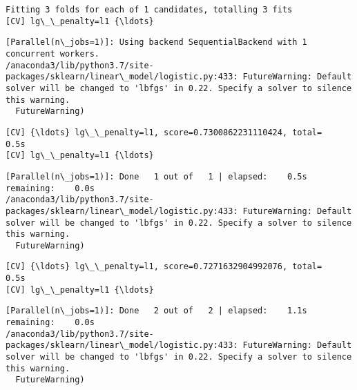 \documentclass[11pt]{article}
\begin{document}
    \begin{Verbatim}[commandchars=\\\{\}]
Fitting 3 folds for each of 1 candidates, totalling 3 fits
[CV] lg\_\_penalty=l1 {\ldots}

    \end{Verbatim}

    \begin{Verbatim}[commandchars=\\\{\}]
[Parallel(n\_jobs=1)]: Using backend SequentialBackend with 1 concurrent workers.
/anaconda3/lib/python3.7/site-packages/sklearn/linear\_model/logistic.py:433: FutureWarning: Default solver will be changed to 'lbfgs' in 0.22. Specify a solver to silence this warning.
  FutureWarning)

    \end{Verbatim}

    \begin{Verbatim}[commandchars=\\\{\}]
[CV] {\ldots} lg\_\_penalty=l1, score=0.7300862231110424, total=   0.5s
[CV] lg\_\_penalty=l1 {\ldots}

    \end{Verbatim}

    \begin{Verbatim}[commandchars=\\\{\}]
[Parallel(n\_jobs=1)]: Done   1 out of   1 | elapsed:    0.5s remaining:    0.0s
/anaconda3/lib/python3.7/site-packages/sklearn/linear\_model/logistic.py:433: FutureWarning: Default solver will be changed to 'lbfgs' in 0.22. Specify a solver to silence this warning.
  FutureWarning)

    \end{Verbatim}

    \begin{Verbatim}[commandchars=\\\{\}]
[CV] {\ldots} lg\_\_penalty=l1, score=0.7271632904992076, total=   0.5s
[CV] lg\_\_penalty=l1 {\ldots}

    \end{Verbatim}

    \begin{Verbatim}[commandchars=\\\{\}]
[Parallel(n\_jobs=1)]: Done   2 out of   2 | elapsed:    1.1s remaining:    0.0s
/anaconda3/lib/python3.7/site-packages/sklearn/linear\_model/logistic.py:433: FutureWarning: Default solver will be changed to 'lbfgs' in 0.22. Specify a solver to silence this warning.
  FutureWarning)

    \end{Verbatim}
\end{document}
